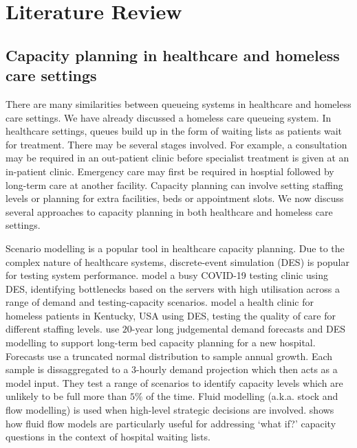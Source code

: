 \documentclass[12pt,a4paper]{article}
\begin{document}
\newpage

\section{Literature Review} \label{lit-rev}

\subsection{Capacity planning in healthcare and homeless care settings}

There are many similarities between queueing systems in healthcare and homeless care settings. We have already discussed a homeless care queueing system. In healthcare settings, queues build up in the form of waiting lists as patients wait for treatment. There may be several stages involved. For example, a consultation may be required in an out-patient clinic before specialist treatment is given at an in-patient clinic. Emergency care may first be required in hosptial followed by long-term care at another facility. Capacity planning can involve setting staffing levels or planning for extra facilities, beds or appointment slots. We now discuss several approaches to capacity planning in both healthcare and homeless care settings. 

Scenario modelling is a popular tool in healthcare capacity planning. Due to the complex nature of healthcare systems, discrete-event simulation (DES) is popular for testing system performance. \cite{el2021supporting} model a busy COVID-19 testing clinic using DES, identifying bottlenecks based on the servers with high utilisation across a range of demand and testing-capacity scenarios. \cite{reynolds2010design} model a health clinic for homeless patients in Kentucky, USA using DES, testing the quality of care for different staffing levels. \cite{lentle2024using} use $20$-year long judgemental demand forecasts and DES modelling to support long-term bed capacity planning for a new hospital. Forecasts use a truncated normal distribution to sample annual growth. Each sample is dissaggregated to a $3$-hourly demand projection which then acts as a model input. They test a range of scenarios to identify capacity levels which are unlikely to be full more than $5\%$ of the time.  Fluid modelling (a.k.a. stock and flow modelling) is used when high-level strategic decisions are involved. \cite{worthington1991hospital} shows how fluid flow models are particularly useful for addressing `what if?' capacity questions in the context of hospital waiting lists.
\end{document}

